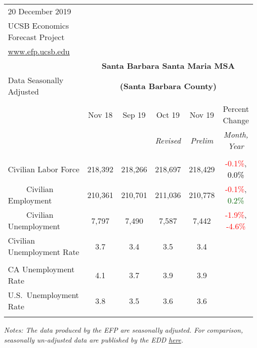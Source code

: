 \documentclass[12pt]{article}
\begin{document}
\begin{table}
\begin{tabular}{|l|c|c|c|c|c|}
\multicolumn{1}{l}{\small 20 December 2019} & \multicolumn{5}{c}{} \\
\multicolumn{1}{l}{\small UCSB Economics Forecast Project} & \multicolumn{5}{c}{} \\
\multicolumn{1}{l}{\small \href{http://www.efp.ucsb.edu/}{www.efp.ucsb.edu}} & \multicolumn{5}{c}{} \\
\multicolumn{1}{c}{} & \multicolumn{5}{c}{\large \textbf{Santa Barbara Santa Maria MSA}} \\
\multicolumn{1}{l}{\small Data Seasonally Adjusted} & \multicolumn{5}{c}{\small \textbf{(Santa Barbara County)}} \\ \hline \hline
& & & & & \\
 & Nov 18 & Sep 19 & Oct 19 & Nov 19 & Percent Change \\
 & & & \small \textit{Revised} & \small \textit{Prelim} & \small \textit{Month, Year} \\ \hline
& & & & & \\
Civilian Labor Force & 218,392 & 218,266 & 218,697 & 218,429 & \textcolor{red}{-0.1\%}, \textcolor{black}{0.0\%} \\
$\qquad$ \small Civilian Employment & 210,361 & 210,701 & 211,036 & 210,778 & \textcolor{red}{-0.1\%}, \textcolor{darkgreen}{0.2\%} \\
$\qquad$ \small Civilian Unemployment & 7,797 & 7,490 & 7,587 & 7,442 & \textcolor{red}{-1.9\%}, \textcolor{red}{-4.6\%} \\
Civilian Unemployment Rate & 3.7 & 3.4 & 3.5 & 3.4 & \\
& & & & & \\
CA Unemployment Rate & 4.1 & 3.7 & 3.9 & 3.9 & \\
U.S.\ Unemployment Rate & 3.8 & 3.5 & 3.6 & 3.6 & \\
& & & & & \\ \hline \hline
\end{tabular}
\par
\vspace{.5em}
\footnotesize
\textit{Notes: The data produced by the EFP are seasonally adjusted. For comparison, seasonally un-adjusted data are published by the EDD \href{http://www.labormarketinfo.ca.gov/file/lfmonth/satb$pds.pdf}{here}.}
\end{table}
\end{document}
